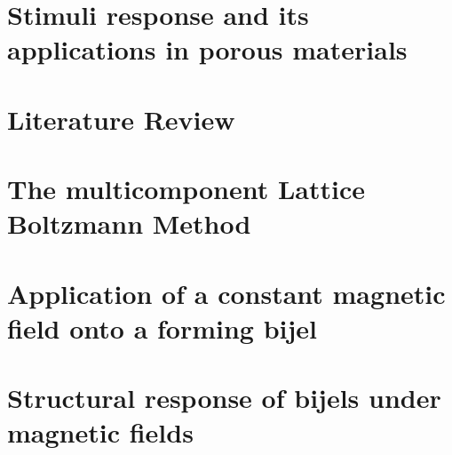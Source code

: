 \documentclass[12pt]{book}
\begin{document}
\newpage

\tableofcontents
\thispagestyle{empty}

\newpage

\listoffigures

\newpage

\listoftables

\newpage

\setcounter{page}{1}

\chapter{Stimuli response and its applications in porous materials}


\chapter{Literature Review}


\chapter{The multicomponent Lattice Boltzmann Method}








\chapter{Application of a constant magnetic field onto a forming bijel}



\chapter{Structural response of bijels under magnetic fields}


\end{document}

